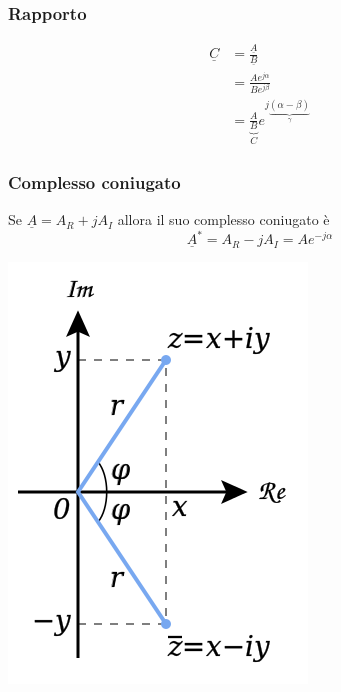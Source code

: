 \documentclass{article}
\begin{document}
\subsubsection*{Rapporto}
\begin{align*}
    \underline{C} &= \frac{\underline{A}}{\underline{B}} \\
    &= \frac{A e^{j \alpha}}{Be^{j \beta}}\\
    &=\underbrace{\frac{A}{B}}_{C} e^{j\underbrace{(\alpha - \beta)}_{\gamma}}
\end{align*}

\subsubsection*{Complesso coniugato}
Se $\underline{A}=A_R+jA_I$ allora il suo complesso coniugato è
\[
    \underline{A}^* = A_R - jA_I = Ae^{-j \alpha}
\]
\begin{center}
    \includegraphics[scale=0.3]{Image/Complex_conjugate_picture.svg.png}
\end{center}
\end{document}
